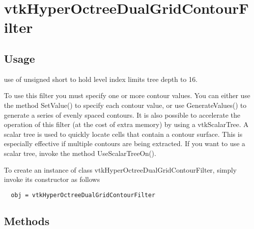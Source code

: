 \section{vtkHyperOctreeDualGridContourFilter}

\subsection{Usage}

 use of unsigned short to hold level index limits tree depth to 16.

 To use this filter you must specify one or more contour values.
 You can either use the method SetValue() to specify each contour
 value, or use GenerateValues() to generate a series of evenly
 spaced contours. It is also possible to accelerate the operation of
 this filter (at the cost of extra memory) by using a
 vtkScalarTree. A scalar tree is used to quickly locate cells that
 contain a contour surface. This is especially effective if multiple
 contours are being extracted. If you want to use a scalar tree,
 invoke the method UseScalarTreeOn().

To create an instance of class vtkHyperOctreeDualGridContourFilter, simply
invoke its constructor as follows
\begin{verbatim}
  obj = vtkHyperOctreeDualGridContourFilter
\end{verbatim}
\subsection{Methods}

